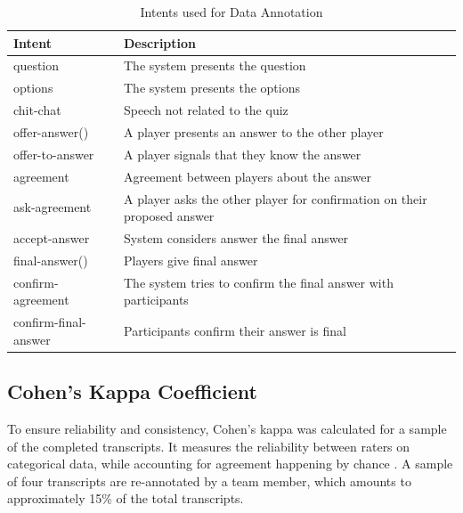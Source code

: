 \documentclass[hidelinks, 11pt]{article}
\begin{document}
\noindent
\begin{table}
  \begin{tabular}{ | p{2.5cm} | p{5cm} | }
    \hline
    \rowcolor{lightgray}
    Intent               & Description                                                              \\
    \hline
    question             & The system presents the question                                         \\
    \hline
    options              & The system presents the options                                          \\
    \hline
    chit-chat            & Speech not related to the quiz                                           \\
    \hline
    offer-answer()       & A player presents an answer to the other player                          \\
    \hline
    offer-to-answer      & A  player signals that they know the answer                              \\
    \hline
    agreement            & Agreement between players about the answer                               \\
    \hline
    ask-agreement        & A player asks the other player for confirmation on their proposed answer \\
    \hline
    accept-answer        & System considers answer the final answer                                 \\
    \hline
    final-answer()       & Players give final answer                                                \\
    \hline
    confirm-agreement    & The system tries to confirm the final answer with participants           \\
    \hline
    confirm-final-answer & Participants confirm their answer is final                               \\
    \hline
  \end{tabular}
  \caption{Intents used for Data Annotation}
  \label{table:intents}
\end{table}

\subsection{Cohen's Kappa Coefficient}
To ensure reliability and consistency, Cohen's kappa was calculated for a sample of the completed transcripts. It measures the reliability between raters on categorical data, while accounting for agreement happening by chance \cite{Cohen_1960}. A sample of four transcripts are re-annotated by a team member, which amounts to approximately 15\% of the total transcripts.
\end{document}
